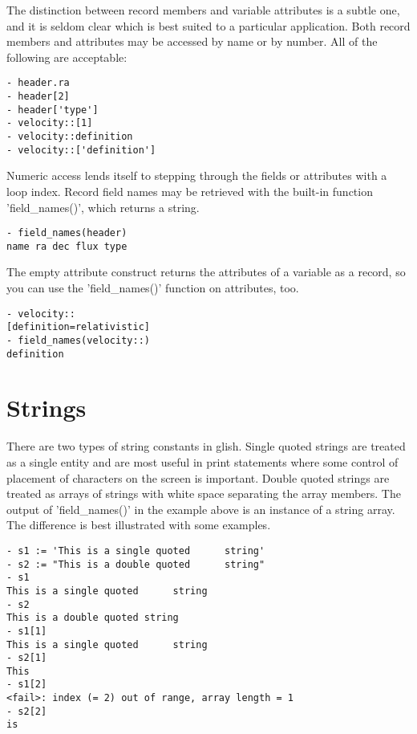 The distinction between record members and variable attributes is a subtle
one, and it is seldom clear which is best suited to a particular
application.  Both record members and attributes may be accessed by name or
by number.  All of the following are acceptable:

\begin{verbatim}
- header.ra
- header[2]
- header['type']
- velocity::[1]
- velocity::definition
- velocity::['definition']
\end{verbatim}

Numeric access lends itself to stepping through the fields or attributes
with a loop index.  Record field names may be retrieved with the built-in
function 'field\_names()', which returns a string.

\begin{verbatim}
- field_names(header)
name ra dec flux type
\end{verbatim}

The empty attribute construct returns the attributes of a variable as a
record, so you can use the 'field\_names()' function on attributes, too.

\begin{verbatim}
- velocity::
[definition=relativistic]
- field_names(velocity::)
definition
\end{verbatim}


\section{Strings}

    There are two types of string constants in glish.  Single quoted
strings are treated as a single entity and are most useful in print
statements where some control of placement of characters on the screen is
important.  Double quoted strings are treated as arrays of strings with
white space separating the array members.  The output of 'field\_names()' in
the example above is an instance of a string array.  The difference is best
illustrated with some examples.

\begin{verbatim}
- s1 := 'This is a single quoted      string'
- s2 := "This is a double quoted      string"
- s1
This is a single quoted      string 
- s2
This is a double quoted string 
- s1[1]
This is a single quoted      string 
- s2[1]
This 
- s1[2]
<fail>: index (= 2) out of range, array length = 1 
- s2[2]
is 
\end{verbatim}


